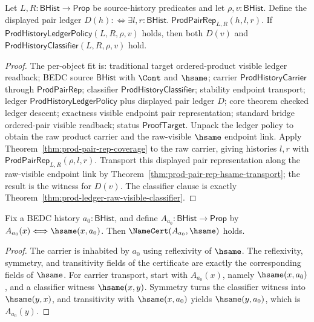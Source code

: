 \begin{theorem}
\label{thm:prod-ledger-visible-pair-representation-readback}
Let $L,R:\mathsf{BHist}\to\mathsf{Prop}$ be source-history predicates and let
$\rho,v:\mathsf{BHist}$. Define the displayed pair ledger
$D(h):\Longleftrightarrow
\exists l,r:\mathsf{BHist}.\;\mathsf{ProdPairRep}_{L,R}(h,l,r)$.
If $\mathsf{ProdHistoryLedgerPolicy}(L,R,\rho,v)$ holds, then both
$D(v)$ and $\mathsf{ProdHistoryClassifier}(L,R,\rho,v)$ hold.
\end{theorem}
\begin{proof}
The per-object fit is: traditional target ordered-product visible ledger
readback; BEDC source $\mathsf{BHist}$ with $\Cont$ and $\hsame$; carrier
$\mathsf{ProdHistoryCarrier}$ through $\mathsf{ProdPairRep}$; classifier
$\mathsf{ProdHistoryClassifier}$; stability endpoint transport; ledger
$\mathsf{ProdHistoryLedgerPolicy}$ plus displayed pair ledger $D$; core theorem
checked ledger descent; exactness visible endpoint pair representation; standard
bridge ordered-pair visible readback; status $\mathsf{ProofTarget}$. Unpack the
ledger policy to obtain the raw product carrier and the raw-visible $\hsame$
endpoint link. Apply
Theorem~\ref{thm:prod-pair-rep-coverage} to the raw carrier, giving histories
$l,r$ with $\mathsf{ProdPairRep}_{L,R}(\rho,l,r)$. Transport this displayed pair
representation along the raw-visible endpoint link by
Theorem~\ref{thm:prod-pair-rep-hsame-transport}; the result is the witness for
$D(v)$. The classifier clause is exactly
Theorem~\ref{thm:prod-ledger-raw-visible-classifier}.
\end{proof}

\begin{theorem}
\label{thm:singleton-history-source-namecert}
Fix a BEDC history $a_0:\mathsf{BHist}$, and define
$A_{a_0}:\mathsf{BHist}\to\mathsf{Prop}$ by
$A_{a_0}(x)\Longleftrightarrow\hsame(x,a_0)$. Then
$\NameCert(A_{a_0},\hsame)$ holds.
\end{theorem}
\begin{proof}
The carrier is inhabited by $a_0$ using reflexivity of $\hsame$. The
reflexivity, symmetry, and transitivity fields of the certificate are exactly
the corresponding fields of $\hsame$. For carrier transport, start with
$A_{a_0}(x)$, namely $\hsame(x,a_0)$, and a classifier witness
$\hsame(x,y)$. Symmetry turns the classifier witness into $\hsame(y,x)$, and
transitivity with $\hsame(x,a_0)$ yields $\hsame(y,a_0)$, which is
$A_{a_0}(y)$.
\end{proof}

